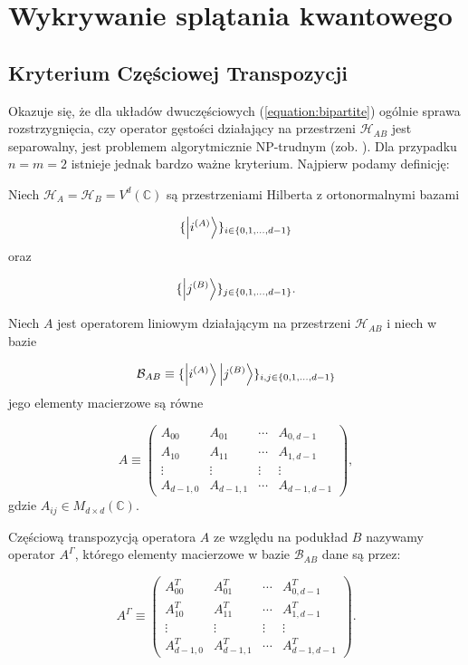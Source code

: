 \section{Wykrywanie splątania kwantowego}

\subsection{Kryterium Częściowej Transpozycji}

Okazuje się, że dla układów dwuczęściowych (\ref{equation:bipartite}) ogólnie sprawa rozstrzygnięcia, czy operator gęstości działający na przestrzeni $\mathcal{H}_{AB}$ jest separowalny, jest problemem algorytmicznie NP-trudnym (zob. \cite{rh}). Dla przypadku $n = m = 2$ istnieje jednak bardzo ważne kryterium. Najpierw podamy definicję:

\begin{definition}
    Niech $\mathcal{H}_{A} = \mathcal{H}_{B} = V ^ {d}(\mathbb{C})$ są przestrzeniami Hilberta z ortonormalnymi bazami

    $$
        \{\ket{i ^ {(A)}}\}_{i \in \{0, 1, \ldots, d - 1\}}
    $$
    oraz

    $$
        \{\ket{j ^ {(B)}}\}_{j \in \{0, 1, \ldots, d - 1\}}.
    $$ 

    Niech $A$ jest operatorem liniowym działającym na przestrzeni $\mathcal{H}_{AB}$ i niech w bazie

    $$
        \mathcal{B}_{AB} \equiv \{\ket{i ^ {(A)}} \ket{j ^ {(B)}}\}_{i, j \in \{0, 1, \ldots, d - 1\}}
    $$
    jego elementy macierzowe są równe

    $$
        A \equiv
        \begin{pmatrix}
            A_{00} & A_{01} & \cdots & A_{0, d - 1} \\
            A_{10} & A_{11} & \cdots & A_{1, d - 1 }\\
            \vdots & \vdots & \vdots & \vdots \\
            A_{d - 1, 0} & A_{d - 1, 1} & \cdots & A_{d - 1, d - 1}
        \end{pmatrix},
    $$
    gdzie $A_{ij} \in M_{d \times d}(\mathbb{C})$.

    Częściową transpozycją operatora $A$ ze względu na podukład $B$ nazywamy operator $A^{\Gamma}$, którego elementy macierzowe w bazie $\mathcal{B}_{AB}$ dane są przez:

    $$
        A ^ {\Gamma} \equiv
        \begin{pmatrix}
            A_{00} ^ {T} & A_{01} ^ {T} & \cdots & A_{0, d - 1} ^ {T} \\
            A_{10} ^ {T} & A_{11} ^ {T} & \cdots & A_{1, d - 1} ^ {T} \\
            \vdots & \vdots & \vdots & \vdots \\
            A_{d - 1, 0} ^ {T} & A_{d - 1, 1} ^ {T} & \cdots & A_{d - 1, d - 1} ^ {T}
        \end{pmatrix}.
    $$
\end{definition}


